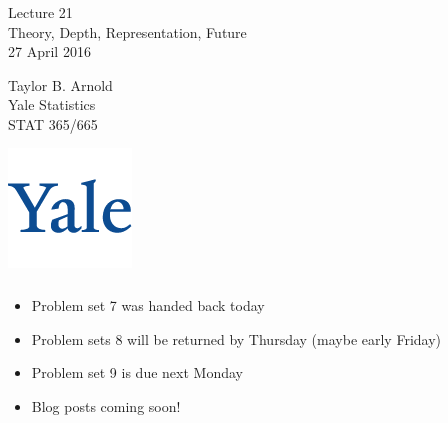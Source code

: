 \documentclass[xetex,mathserif,serif,aspectratio=169]{beamer}
\begin{document}
\begin{frame}[fragile] \frametitle{} \oldB \small

\vfill

{\fontsize{0.7cm}{0cm}\selectfont Lecture 21 \\\vspace{0.2cm}
Theory, Depth, Representation, Future}\\\vspace{0.5cm}
27 April 2016

\vspace{2cm}

\begin{minipage}{0.6\textwidth}
Taylor B. Arnold \\
Yale Statistics \\
STAT 365/665
\end{minipage}
\hfill
\begin{minipage}{0.3\textwidth}\raggedleft
\includegraphics[scale=0.3]{../yale-logo.png}
\end{minipage}%

\end{frame}

\begin{frame}[fragile] \frametitle{} \oldB \small


\begin{itemize}
\item Problem set 7 was handed back today
\item Problem sets 8 will be returned by Thursday (maybe early Friday)
\item Problem set 9 is due next Monday
\item Blog posts coming soon!
\end{itemize}

\end{frame}
\end{document}
